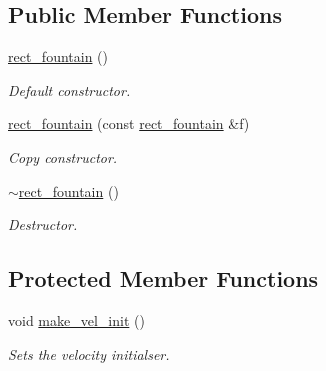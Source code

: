\subsection*{Public Member Functions}
\begin{DoxyCompactItemize}
\item 
\mbox{\label{classphysim_1_1emitters_1_1free__emitters_1_1rect__fountain_acd9f95ada0c4b401c96d06214e377f36}} 
\hyperlink{classphysim_1_1emitters_1_1free__emitters_1_1rect__fountain_acd9f95ada0c4b401c96d06214e377f36}{rect\+\_\+fountain} ()
\begin{DoxyCompactList}\small\item\em Default constructor. \end{DoxyCompactList}\item 
\hyperlink{classphysim_1_1emitters_1_1free__emitters_1_1rect__fountain_a48f4339f6374aa9adbdd1031e1eadb33}{rect\+\_\+fountain} (const \hyperlink{classphysim_1_1emitters_1_1free__emitters_1_1rect__fountain}{rect\+\_\+fountain} \&f)
\begin{DoxyCompactList}\small\item\em Copy constructor. \end{DoxyCompactList}\item 
\mbox{\label{classphysim_1_1emitters_1_1free__emitters_1_1rect__fountain_a14e67f38b21eee05cb0fa496d78384e5}} 
\hyperlink{classphysim_1_1emitters_1_1free__emitters_1_1rect__fountain_a14e67f38b21eee05cb0fa496d78384e5}{$\sim$rect\+\_\+fountain} ()
\begin{DoxyCompactList}\small\item\em Destructor. \end{DoxyCompactList}\end{DoxyCompactItemize}
\subsection*{Protected Member Functions}
\begin{DoxyCompactItemize}
\item 
void \hyperlink{classphysim_1_1emitters_1_1free__emitters_1_1rect__fountain_a86c3d792fa977ef2b97785abced613ae}{make\+\_\+vel\+\_\+init} ()
\begin{DoxyCompactList}\small\item\em Sets the velocity initialser. \end{DoxyCompactList}\end{DoxyCompactItemize}
